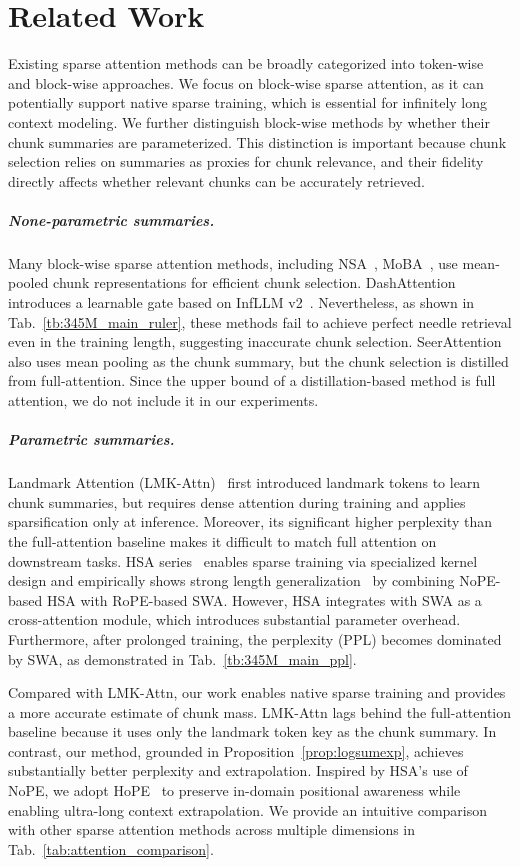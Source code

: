 \section{Related Work}
Existing sparse attention methods can be broadly categorized into token-wise~\cite{liu2025deepseek} and block-wise approaches.
We focus on block-wise sparse attention, as it can potentially support native sparse training, which is essential for infinitely long context modeling. 
We further distinguish block-wise methods by whether their chunk summaries are parameterized. This distinction is important because chunk selection relies on summaries as proxies for chunk relevance, and their fidelity directly affects whether relevant chunks can be accurately retrieved.
\subparagraph{None-parametric summaries.}
Many block-wise sparse attention methods, including NSA~\cite{yuan-etal-2025-native}, MoBA~\cite{DBLP:journals/corr/abs-2502-13189}, use mean-pooled chunk representations for efficient chunk selection. DashAttention~\cite{huang2026dashattentiondifferentiableadaptivesparse} introduces a learnable gate based on InfLLM v2~\cite{zhao2025infllmv2densesparseswitchableattention}. Nevertheless, as shown in Tab.~\ref{tb:345M_main_ruler}, these methods fail to achieve perfect needle retrieval even in the training length, suggesting inaccurate chunk selection.
SeerAttention~\cite{gao2025seerattentionlearningintrinsicsparse} also uses mean pooling as the chunk summary, but the chunk selection is distilled from full-attention. Since the upper bound of a distillation-based method is full attention, we do not include it in our experiments.

\subparagraph{Parametric summaries.}
Landmark Attention (LMK-Attn)~\cite{mohtashami2023random} first introduced landmark tokens to learn chunk summaries, but requires dense attention during training and applies sparsification only at inference. 
Moreover, its significant higher perplexity than the full-attention baseline makes it difficult to match full attention on downstream tasks.
HSA series~\cite{hu2026hardware,hu2026everytoken} enables sparse training via specialized kernel design and empirically shows strong length generalization~\cite{leng2026understanding} by combining NoPE-based HSA with RoPE-based SWA. 
However, HSA integrates with SWA as a cross-attention module, which introduces substantial parameter overhead. Furthermore, after prolonged training, the perplexity (PPL) becomes dominated by SWA, as demonstrated in Tab.~\ref{tb:345M_main_ppl}.

Compared with LMK-Attn, our work enables native sparse training and provides a more accurate estimate of chunk mass. LMK-Attn lags behind the full-attention baseline because it uses only the landmark token key as the chunk summary. In contrast, our method, grounded in Proposition~\ref{prop:logsumexp}, achieves substantially better perplexity and extrapolation. Inspired by HSA’s use of NoPE, we adopt HoPE~\cite{chen-etal-2025-hope} to preserve in-domain positional awareness while enabling ultra-long context extrapolation. We provide an intuitive comparison with other sparse attention methods across multiple dimensions in Tab.~\ref{tab:attention_comparison}.



